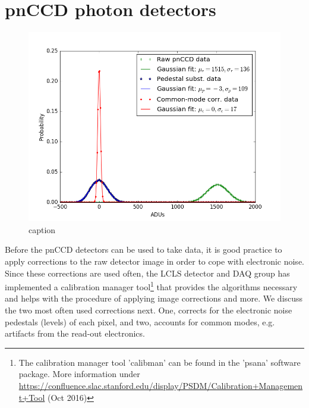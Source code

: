 \section{pnCCD photon detectors}\label{sec:pnccd-corr}
\begin{figure}
	\centering
		\includegraphics[width=1.00\textwidth]{images/pnCCD-electronic-noise.png}
	\caption{caption}
	\label{fig:pnCCD-electronic-noise}
\end{figure}
Before the pnCCD detectors can be used to take data, it is good practice to apply corrections to the raw detector image in order to cope with electronic noise. Since these corrections are used often, the LCLS detector and DAQ group has implemented a calibration manager tool\footnote{The calibration manager tool 'calibman' can be found in the 'psana' software package. More information under \url{https://confluence.slac.stanford.edu/display/PSDM/Calibration+Management+Tool} (Oct 2016)} that provides the algorithms necessary and helps with the procedure of applying image corrections and more. We discuss the two most often used corrections next. One, corrects for the electronic noise pedestals (levels) of each pixel, and two, accounts for common modes, e.g. artifacts from the read-out electronics.\\
%
